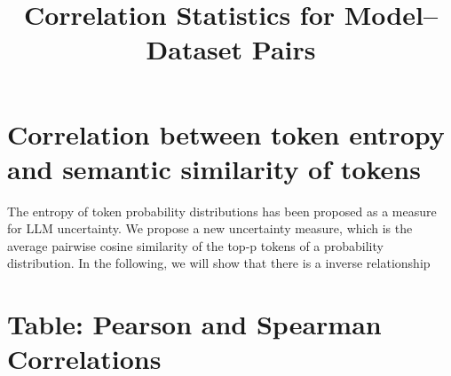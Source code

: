 \documentclass{article}
\title{Correlation Statistics for Model–Dataset Pairs}
\date{}
\begin{document}
\maketitle

\section{Correlation between token entropy and semantic similarity of tokens}
The entropy of token probability distributions has been proposed as a measure for LLM uncertainty.
We propose a new uncertainty measure, which is the average pairwise cosine similarity of the top-p tokens of a probability distribution.
In the following, we will show that there is a inverse relationship

\section*{Table: Pearson and Spearman Correlations}

\end{document}
